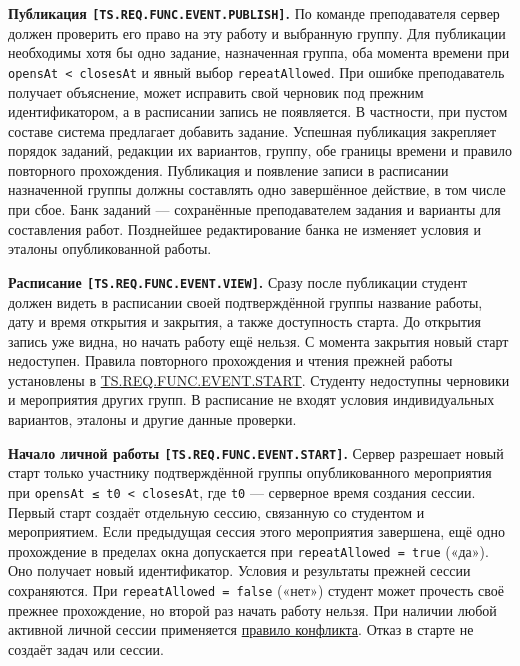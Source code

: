 \documentclass[12pt,a4paper]{article}
\begin{document}
\hypertarget{ts-req-func-event-publish}{} \textbf{Публикация \texttt{[TS.\allowbreak{}REQ.\allowbreak{}FUNC.\allowbreak{}EVENT.\allowbreak{}PUBLISH]}.} По команде преподавателя сервер должен проверить его право на эту работу и выбранную группу. Для публикации необходимы хотя бы одно задание, назначенная группа, оба момента времени при \texttt{opensAt\ \textless{}\ closesAt} и явный выбор \texttt{repeatAllowed}. При ошибке преподаватель получает объяснение, может исправить свой черновик под прежним идентификатором, а в расписании запись не появляется. В частности, при пустом составе система предлагает добавить задание. Успешная публикация закрепляет порядок заданий, редакции их вариантов, группу, обе границы времени и правило повторного прохождения. Публикация и появление записи в расписании назначенной группы должны составлять одно завершённое действие, в том числе при сбое. Банк заданий --- сохранённые преподавателем задания и варианты для составления работ. Позднейшее редактирование банка не изменяет условия и эталоны опубликованной работы.

\hypertarget{ts-req-func-event-view}{} \textbf{Расписание \texttt{[TS.\allowbreak{}REQ.\allowbreak{}FUNC.\allowbreak{}EVENT.\allowbreak{}VIEW]}.} Сразу после публикации студент должен видеть в расписании своей подтверждённой группы название работы, дату и время открытия и закрытия, а также доступность старта. До открытия запись уже видна, но начать работу ещё нельзя. С момента закрытия новый старт недоступен. Правила повторного прохождения и чтения прежней работы установлены в {\hyperlink{ts-req-func-event-start}{TS.REQ.FUNC.EVENT.START}}. Студенту недоступны черновики и мероприятия других групп. В расписание не входят условия индивидуальных вариантов, эталоны и другие данные проверки.

\hypertarget{ts-req-func-event-start}{} \textbf{Начало личной работы \texttt{[TS.\allowbreak{}REQ.\allowbreak{}FUNC.\allowbreak{}EVENT.\allowbreak{}START]}.} Сервер разрешает новый старт только участнику подтверждённой группы опубликованного мероприятия при \texttt{opensAt\ ≤\ t0\ \textless{}\ closesAt}, где \texttt{t0} --- серверное время создания сессии. Первый старт создаёт отдельную сессию, связанную со студентом и мероприятием. Если предыдущая сессия этого мероприятия завершена, ещё одно прохождение в пределах окна допускается при \texttt{repeatAllowed\ =\ true} («да»). Оно получает новый идентификатор. Условия и результаты прежней сессии сохраняются. При \texttt{repeatAllowed\ =\ false} («нет») студент может прочесть своё прежнее прохождение, но второй раз начать работу нельзя. При наличии любой активной личной сессии применяется {\hyperlink{ts-req-func-session-create}{правило конфликта}}. Отказ в старте не создаёт задач или сессии.
\end{document}
